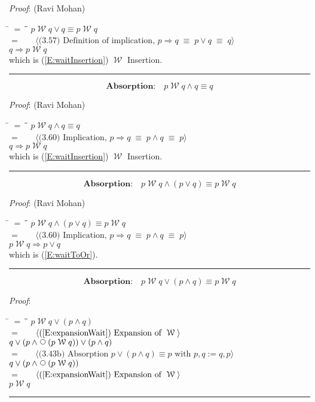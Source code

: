 \documentclass[12pt, fleqn, leqno]{article}
\newcommand{\lgap}{2pt}                             %
\newcommand{\mymathindent}{24pt}                    %
\newcommand{\equivs}{\ensuremath{\;\equiv\;}}       %
\newcommand{\impl}{\ensuremath{\Rightarrow}}        %
\newcommand{\Wait}{\;\mathcal{W}\;}
\newcommand{\Next}{\;\,\text{\raisebox{3.5pt}{\circle{6}}}}
\newcommand{\myqed}{\rule[-.23ex]{1.2ex}{2.0ex}}
\newcommand{\myqedtab}{\hspace{384pt}}              %
\newcommand{\Gll} {\langle}                         %
\newcommand{\Ggg} {\rangle}                         %
\newcommand{\Hint}[1]     {\ \ \ $\Gll              \mbox{#1} \Ggg$ }   %
\begin{document}
\emph{Proof}: (Ravi Mohan)
\begin{tabbing}
\hspace{\mymathindent} \= $= \;$ \= \myqedtab \= \kill
\> \> $p\Wait q\lor q\equiv p\Wait q$\\[\lgap]
\> $=$ \> \Hint{(3.57) Definition of implication, $p\impl q\equivs p\lor q \equivs q$} \\[\lgap]
\> \> $q\impl p\Wait q$\\[\lgap]
\> which is (\ref{E:waitInsertion}) $\Wait$ Insertion. \quad \myqed
\end{tabbing}
\begin{equation}\label{E:waitAndQ}
\textbf{Absorption:}\quad p\Wait q\land q\equiv q
\end{equation}

\emph{Proof}: (Ravi Mohan)
\begin{tabbing}
\hspace{\mymathindent} \= $= \;$ \= \myqedtab \= \kill
\> \> $p\Wait q\land q\equiv q$\\[\lgap]
\> $=$  \>  \Hint{(3.60) Implication, $p\impl q \equivs p\land q \equivs p$}\\[\lgap]
\> \> $q\impl p\Wait q$\\[\lgap]
\> which is (\ref{E:waitInsertion}) $\Wait$ Insertion. \quad \myqed
\end{tabbing}
\begin{equation}\label{E:waitAndOr}
\textbf{Absorption:}\quad p\Wait q\land (p\lor q) \equiv p\Wait q
\end{equation}

\emph{Proof}: (Ravi Mohan)
\begin{tabbing}
\hspace{\mymathindent} \= $= \;$ \= \myqedtab \= \kill
\> \> $p\Wait q\land (p\lor q) \equiv p\Wait q$\\[\lgap]
\> $=$  \>  \Hint{(3.60) Implication, $p\impl q \equivs p\land q \equivs p$}\\[\lgap]
\> \> $p\Wait q\impl p\lor q$\\[\lgap]
\> which is (\ref{E:waitToOr}). \quad \myqed
\end{tabbing}
\begin{equation}\label{E:waitOrAnd}
\textbf{Absorption:}\quad p\Wait q\lor (p\land q) \equiv p\Wait q
\end{equation}

\emph{Proof}:
\begin{tabbing}
\hspace{\mymathindent} \= $= \;$ \= \myqedtab \= \kill
\> \> $p\Wait q\lor (p\land q)$\\[\lgap]
\> $=$ \> \Hint{(\ref{E:expansionWait}) Expansion of $\Wait$} \\[\lgap]
\> \> $q\lor (p\land \Next (p\Wait q)) \lor (p\land q)$\\[\lgap]
  \> $=$  \>  \Hint{(3.43b) Absorption $p \lor (p \land q) \equiv p$ with $p,q:=q,p$}\\[\lgap]
\> \> $q\lor (p\land \Next (p\Wait q))$\\[\lgap]
\> $=$ \> \Hint{(\ref{E:expansionWait}) Expansion of $\Wait$} \\[\lgap]
\> \> $p\Wait q$ \quad \myqed
\end{tabbing}
\end{document}
